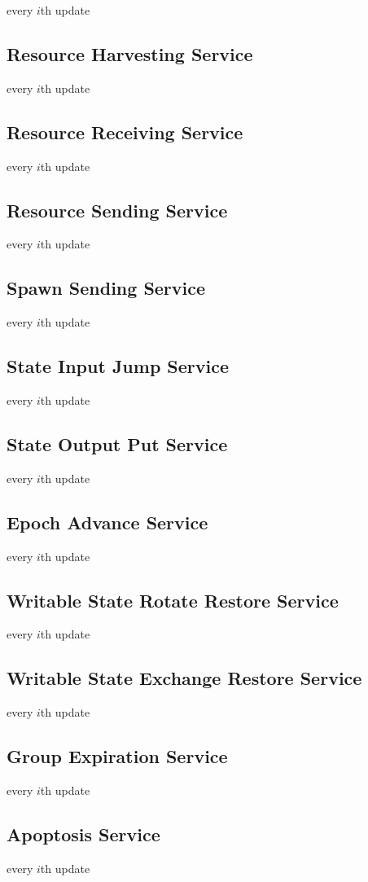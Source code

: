 every $i$th update

\subsection{Resource Harvesting Service}

every $i$th update

\subsection{Resource Receiving Service}

every $i$th update

\subsection{Resource Sending Service}

every $i$th update

\subsection{Spawn Sending Service}

every $i$th update

\subsection{State Input Jump Service}

every $i$th update

\subsection{State Output Put Service}

every $i$th update

\subsection{Epoch Advance Service}

every $i$th update

\subsection{Writable State Rotate Restore Service}

every $i$th update

\subsection{Writable State Exchange Restore Service}

every $i$th update

\subsection{Group Expiration Service}

every $i$th update

\subsection{Apoptosis Service}

every $i$th update

